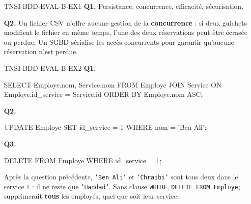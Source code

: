 \begin{corrige}{TNSI-BDD-EVAL-B-EX1}
\textbf{Q1.} Persistance, concurrence, efficacité, sécurisation.

\textbf{Q2.} Un fichier CSV n'offre aucune gestion de la \textbf{concurrence} : si deux guichets modifient le fichier en même temps, l'une des deux réservations peut être écrasée ou perdue. Un SGBD sérialise les accès concurrents pour garantir qu'aucune réservation n'est perdue.
\end{corrige}

\begin{corrige}{TNSI-BDD-EVAL-B-EX2}
\textbf{Q1.}
\begin{sql}
SELECT Employe.nom, Service.nom
FROM Employe
JOIN Service ON Employe.id_service = Service.id
ORDER BY Employe.nom ASC;
\end{sql}

\textbf{Q2.}
\begin{sql}
UPDATE Employe SET id_service = 1 WHERE nom = 'Ben Ali';
\end{sql}

\textbf{Q3.}
\begin{sql}
DELETE FROM Employe WHERE id_service = 1;
\end{sql}
Après la question précédente, \texttt{'Ben Ali'} et \texttt{'Chraibi'} sont tous deux dans le service $1$ : il ne reste que \texttt{'Haddad'}. Sans clause \texttt{WHERE}, \texttt{DELETE FROM Employe;} supprimerait \textbf{tous} les employés, quel que soit leur service.
\end{corrige}
